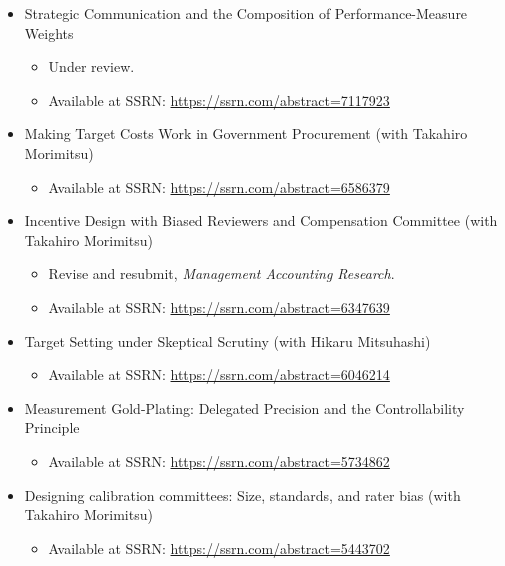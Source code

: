 \documentclass[letterpaper,11pt]{article}
\begin{document}
\begin{itemize}
    \item Strategic Communication and the Composition of Performance-Measure Weights
        \begin{itemize}
            \item Under review.
            \item Available at SSRN: \url{https://ssrn.com/abstract=7117923}
        \end{itemize}

    \item Making Target Costs Work in Government Procurement (with Takahiro Morimitsu)
        \begin{itemize}
            \item Available at SSRN: \url{https://ssrn.com/abstract=6586379}
        \end{itemize}

    \item Incentive Design with Biased Reviewers and Compensation Committee (with Takahiro Morimitsu)
        \begin{itemize}
            \item Revise and resubmit, \textit{Management Accounting Research}.
            \item Available at SSRN: \url{https://ssrn.com/abstract=6347639}
        \end{itemize}

    \item Target Setting under Skeptical Scrutiny (with Hikaru Mitsuhashi)
        \begin{itemize}
            \item Available at SSRN: \url{https://ssrn.com/abstract=6046214}
        \end{itemize}

    \item Measurement Gold-Plating: Delegated Precision and the Controllability Principle
        \begin{itemize}
            \item Available at SSRN: \url{https://ssrn.com/abstract=5734862}
        \end{itemize}

    \item Designing calibration committees: Size, standards, and rater bias (with Takahiro Morimitsu)
        \begin{itemize}
            \item Available at SSRN: \url{https://ssrn.com/abstract=5443702}
        \end{itemize}


\end{itemize}
\end{document}

